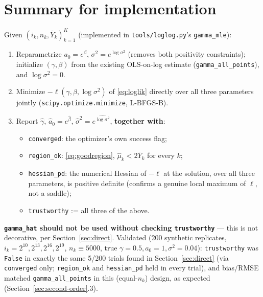 \documentclass[11pt]{article}
\begin{document}
\section{Summary for implementation}
\label{sec:implementation}

Given $(i_k, n_k, \overline{Y}_k)_{k=1}^K$ (implemented in
\texttt{tools/loglog.py}'s \texttt{gamma\_mle}):
\begin{enumerate}
\item Reparametrize $a_0 = e^\beta$, $\sigma^2 = e^{\log\sigma^2}$ (removes
      both positivity constraints); initialize $(\gamma,\beta)$ from the
      existing OLS-on-log estimate (\texttt{gamma\_all\_points}), and
      $\log\sigma^2 = 0$.
\item Minimize $-\ell(\gamma,\beta,\log\sigma^2)$ of \eqref{eq:loglik} directly
      over all three parameters jointly (\texttt{scipy.optimize.minimize},
      L-BFGS-B).
\item Report $\hat\gamma$, $\hat a_0=e^{\hat\beta}$,
      $\hat\sigma^2=e^{\widehat{\log\sigma^2}}$, \textbf{together with}:
      \begin{itemize}
      \item \texttt{converged}: the optimizer's own success flag;
      \item \texttt{region\_ok}: \eqref{eq:goodregion},
            $\hat\mu_k < 2\overline{Y}_k$ for every $k$;
      \item \texttt{hessian\_pd}: the numerical Hessian of $-\ell$ at the
            solution, over all three parameters, is positive definite
            (confirms a genuine local maximum of $\ell$, not a saddle);
      \item \texttt{trustworthy} := all three of the above.
      \end{itemize}
\end{enumerate}
\textbf{\texttt{gamma\_hat} should not be used without checking
\texttt{trustworthy}} --- this is not decorative, per
Section~\ref{sec:direct}. Validated (200 synthetic replicates,
$i_k=2^{10},2^{13},2^{16},2^{19}$, $n_k\equiv5000$, true
$\gamma=0.5,a_0=1,\sigma^2=0.04$): \texttt{trustworthy} was \texttt{False} in
exactly the same 5/200 trials found in Section~\ref{sec:direct} (via
\texttt{converged} only; \texttt{region\_ok} and \texttt{hessian\_pd} held in
every trial), and bias/RMSE matched \texttt{gamma\_all\_points} in this
(equal-$n_k$) design, as expected (Section~\ref{sec:second-order}.3).
\end{document}
